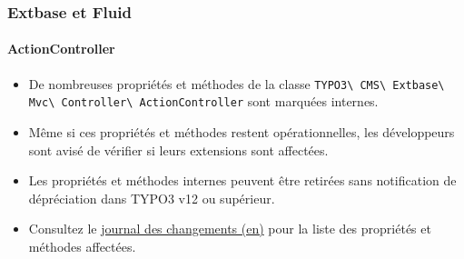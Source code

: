 %

\begin{frame}[fragile]
	\frametitle{Extbase et Fluid}
	\framesubtitle{ActionController}

	\begin{itemize}
		\item De nombreuses propriétés et méthodes de la classe
			\small\texttt{TYPO3\textbackslash
				CMS\textbackslash
				Extbase\textbackslash
				Mvc\textbackslash
				Controller\textbackslash
				ActionController}\normalsize\newline
			sont marquées internes.
		\item Même si ces propriétés et méthodes restent opérationnelles,
			les développeurs sont avisé de vérifier si leurs extensions sont affectées.
		\item Les propriétés et méthodes internes peuvent être retirées sans notification de
			dépréciation dans TYPO3 v12 ou supérieur.
		\item Consultez le \href{https://docs.typo3.org/c/typo3/cms-core/master/en-us/Changelog/11.0/Important-92996-PropertiesAndMethodsInActionControllerMarkedInternal.html}{journal des changements (en)}
			pour la liste des propriétés et méthodes affectées.
	\end{itemize}

\end{frame}

